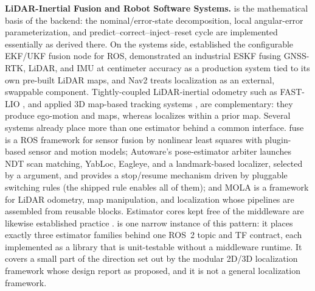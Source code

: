 \noindent\textbf{LiDAR-Inertial Fusion and Robot Software Systems.}
\citet{sola2017quaternion} is the mathematical basis of the  backend: the nominal/error-state decomposition, local angular-error parameterization, and predict--correct--inject--reset cycle are implemented essentially as derived there. On the systems side, \citet{moore2014generalized} established the configurable EKF/UKF fusion node for ROS, \citet{wan2018robust} demonstrated an industrial ESKF fusing GNSS-RTK, LiDAR, and IMU at centimeter accuracy as a production system tied to its own pre-built LiDAR maps, and Nav2 \citep{macenski2020marathon} treats localization as an external, swappable component. Tightly-coupled LiDAR-inertial odometry such as FAST-LIO \citep{xu2021fastlio}, and applied 3D map-based tracking systems \citep{koide2019portable}, are complementary: they produce ego-motion and maps, whereas \sname{} localizes within a prior map. Several systems already place more than one estimator behind a common interface. fuse \citep{locus2018fuse} is a ROS framework for sensor fusion by nonlinear least squares with plugin-based sensor and motion models; Autoware's pose-estimator arbiter \citep{autoware2024arbiter} launches NDT scan matching, YabLoc, Eagleye, and a landmark-based localizer, selected by a  argument, and provides a stop/resume mechanism driven by pluggable switching rules (the shipped rule enables all of them); and MOLA \citep{blancoclaraco2025mola} is a framework for LiDAR odometry, map manipulation, and localization whose pipelines are assembled from reusable blocks. Estimator cores kept free of the middleware are likewise established practice \citep{puga2024beluga,pedrosa2019lama}. \sname{} is one narrow instance of this pattern: it places exactly three estimator families behind one ROS~2 topic and TF contract, each implemented as a library that is unit-testable without a middleware runtime. It covers a small part of the direction set out by the modular 2D/3D localization framework whose design \citet{macenski2023survey} report as proposed, and it is not a general localization framework.

